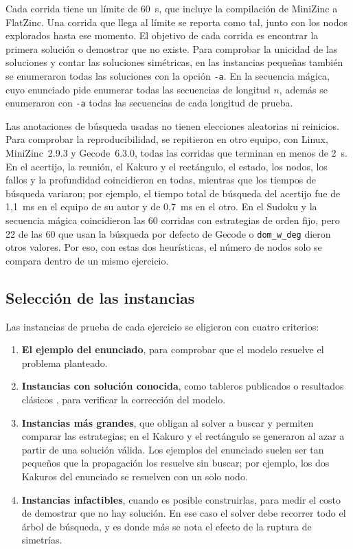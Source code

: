 Cada corrida tiene un límite de 60~s, que incluye la compilación de MiniZinc a FlatZinc. Una corrida que llega al límite se reporta como tal, junto con los nodos explorados hasta ese momento. El objetivo de cada corrida es encontrar la primera solución o demostrar que no existe. Para comprobar la unicidad de las soluciones y contar las soluciones simétricas, en las instancias pequeñas también se enumeraron todas las soluciones con la opción \texttt{-a}.
En la secuencia mágica, cuyo enunciado pide enumerar todas las secuencias de longitud $n$, además se enumeraron con \texttt{-a} todas las secuencias de cada longitud de prueba.

Las anotaciones de búsqueda usadas no tienen elecciones aleatorias ni reinicios. Para comprobar la reproducibilidad, se repitieron en otro equipo, con Linux, MiniZinc~2.9.3 y Gecode~6.3.0, todas las corridas que terminan en menos de 2~s. En el acertijo, la reunión, el Kakuro y el rectángulo, el estado, los nodos, los fallos y la profundidad coincidieron en todas, mientras que los tiempos de búsqueda variaron; por ejemplo, el tiempo total de búsqueda del acertijo fue de 1,1~ms en el equipo de su autor y de 0,7~ms en el otro. En el Sudoku y la secuencia mágica coincidieron las 60 corridas con estrategias de orden fijo, pero 22 de las 60 que usan la búsqueda por defecto de Gecode o \texttt{dom\_w\_deg} dieron otros valores. Por eso, con estas dos heurísticas, el número de nodos solo se compara dentro de un mismo ejercicio.

\subsection{Selección de las instancias}

Las instancias de prueba de cada ejercicio se eligieron con cuatro criterios:

\begin{enumerate}
    \item \textbf{El ejemplo del enunciado}, para comprobar que el modelo resuelve el problema planteado.
    \item \textbf{Instancias con solución conocida}, como tableros publicados o resultados clásicos \parencite{minizinc-benchmarks,duijvestijn1978}, para verificar la corrección del modelo.
    \item \textbf{Instancias más grandes}, que obligan al solver a buscar y permiten comparar las estrategias; en el Kakuro y el rectángulo se generaron al azar a partir de una solución válida. Los ejemplos del enunciado suelen ser tan pequeños que la propagación los resuelve sin buscar; por ejemplo, los dos Kakuros del enunciado se resuelven con un solo nodo.
    \item \textbf{Instancias infactibles}, cuando es posible construirlas, para medir el costo de demostrar que no hay solución. En ese caso el solver debe recorrer todo el árbol de búsqueda, y es donde más se nota el efecto de la ruptura de simetrías.
\end{enumerate}

